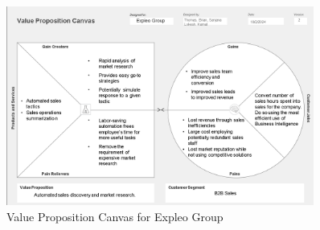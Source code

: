 \begin{figure}[h]
    \centering
    \includegraphics[width=0.9\textwidth]{vpc.png}
    \caption{Value Proposition Canvas for Expleo Group}
    \label{fig:vpc}
\end{figure}